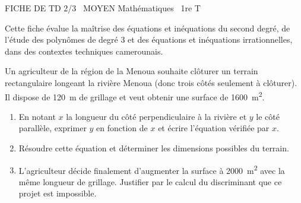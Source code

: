 \documentclass[11pt]{article}
\begin{document}
\begin{tcolorbox}[enhanced,colback=popink,colframe=popink,arc=10pt,boxrule=0pt,left=12pt,right=12pt,top=9pt,bottom=9pt]
{\color{white}\popxbold\small FICHE DE TD 2/3 \textbullet\ MOYEN \hfill Mathématiques \textbullet\ 1re T\par}
\end{tcolorbox}
\vspace{4pt}
Cette fiche évalue la maîtrise des équations et inéquations du second degré, de l'étude des polynômes de degré 3 et des équations et inéquations irrationnelles, dans des contextes techniques camerounais.

\begin{exercice}
Un agriculteur de la région de la Menoua souhaite clôturer un terrain rectangulaire longeant la rivière Menoua (donc trois côtés seulement à clôturer). Il dispose de \SI{120}{\meter} de grillage et veut obtenir une surface de \SI{1600}{\meter\squared}.
\begin{enumerate}
    \item En notant $x$ la longueur du côté perpendiculaire à la rivière et $y$ le côté parallèle, exprimer $y$ en fonction de $x$ et écrire l'équation vérifiée par $x$.
    \item Résoudre cette équation et déterminer les dimensions possibles du terrain.
    \item L'agriculteur décide finalement d'augmenter la surface à \SI{2000}{\meter\squared} avec la même longueur de grillage. Justifier par le calcul du discriminant que ce projet est impossible.
\end{enumerate}
\end{exercice}
\end{document}
